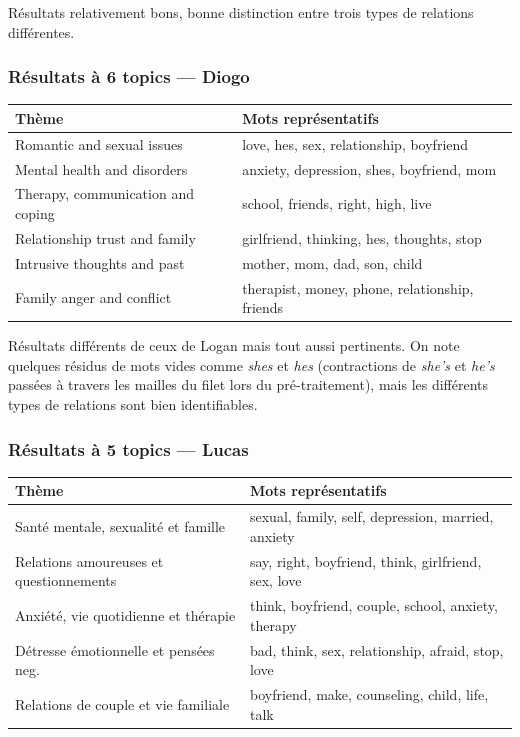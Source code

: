 \documentclass[12pt,a4paper]{article}
\begin{document}
\begin{remarque}
  Résultats relativement bons, bonne distinction entre trois types de relations différentes.
\end{remarque}

\subsubsection*{Résultats à 6 topics --- Diogo}

\begin{center}
\begin{tabular}{ll}
\toprule
\textbf{Thème} & \textbf{Mots représentatifs} \\
\midrule
Romantic and sexual issues              & love, hes, sex, relationship, boyfriend \\
Mental health and disorders             & anxiety, depression, shes, boyfriend, mom \\
Therapy, communication and coping       & school, friends, right, high, live \\
Relationship trust and family           & girlfriend, thinking, hes, thoughts, stop \\
Intrusive thoughts and past             & mother, mom, dad, son, child \\
Family anger and conflict               & therapist, money, phone, relationship, friends \\
\bottomrule
\end{tabular}
\end{center}
\begin{remarque}
  Résultats différents de ceux de Logan mais tout aussi pertinents. 
  On note quelques résidus de mots vides comme \textit{shes} et \textit{hes} 
  (contractions de \textit{she's} et \textit{he's} passées à travers les 
  mailles du filet lors du pré-traitement), mais les différents types de 
  relations sont bien identifiables.
\end{remarque}

\break
\subsubsection*{Résultats à 5 topics --- Lucas}

\begin{center}
\begin{tabular}{ll}
\toprule
\textbf{Thème} & \textbf{Mots représentatifs} \\
\midrule
Santé mentale, sexualité et famille     & sexual, family, self, depression, married, anxiety \\
Relations amoureuses et questionnements & say, right, boyfriend, think, girlfriend, sex, love \\
Anxiété, vie quotidienne et thérapie    & think, boyfriend, couple, school, anxiety, therapy \\
Détresse émotionnelle et pensées neg.   & bad, think, sex, relationship, afraid, stop, love \\
Relations de couple et vie familiale    & boyfriend, make, counseling, child, life, talk \\
\bottomrule
\end{tabular}
\end{center}
\end{document}
